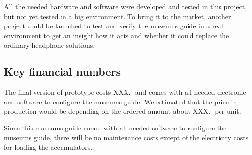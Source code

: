 All the needed hardware and software were developed and tested in this project, but not yet tested in a big environment. To bring it to the market, another project could be launched to test and verify the museums guide in a real environment to get an insight how it acts and whether it could replace the ordinary headphone solutions.

\subsection*{Key financial numbers}

The final version of prototype costs XXX.- and comes with all needed electronic and software to configure the museums guide. We estimated that the price in production would be depending on the ordered amount about XXX.- per unit.

Since this museums guide comes with all needed software to configure the museums guide, there will be no maintenance costs except of the electricity costs for loading the accumulators.